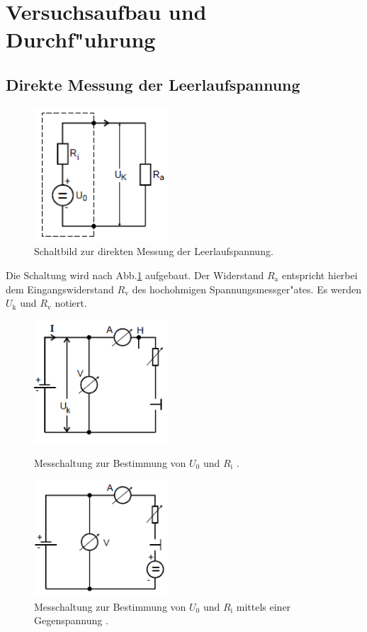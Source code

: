 \section{Versuchsaufbau und Durchf"uhrung} %
\label{sec:durchfuehrung}

\subsection{Direkte Messung der Leerlaufspannung} %
\label{sub:direkte_messung_der_leerlaufspannung}

\begin{figure}
	\centering
	\includegraphics[width = 5cm]{img/Monozelle.PNG}
	\caption{Schaltbild zur direkten Messung der Leerlaufspannung. \cite{anleitung}}
	\label{aufgabea}
\end{figure}

Die Schaltung wird nach Abb.\ref{aufgabea} aufgebaut. Der Widerstand $R_\mathrm{a}$ entspricht hierbei dem Eingangswiderstand $R_\mathrm{v}$ des hochohmigen Spannungsmessger"ates.
Es werden $U_\mathrm{k}$ und $R_\mathrm{v}$ notiert.

\clearpage

\begin{figure}
	\centering
	\includegraphics[width = 5cm]{img/b.PNG}
	\caption{Messchaltung zur Bestimmung von $U_\mathrm{0}$ und $R_\mathrm{i}$ \cite{anleitung}.}
	\label{aufgabeb}

	\includegraphics[width = 5cm]{img/c.PNG}
	\caption{Messchaltung zur Bestimmung von $U_\mathrm{0}$ und $R_\mathrm{i}$ mittels einer Gegenspannung \cite{anleitung}.}
	\label{aufgabec}
\end{figure}

